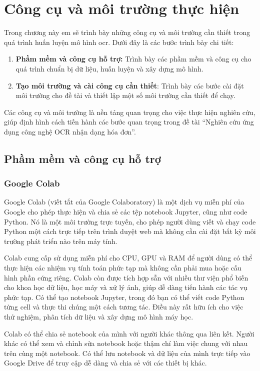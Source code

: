 \chapter{Công cụ và môi trường thực hiện}
Trong chương này em sẽ trình bày những công cụ và môi trường cần thiết trong quá trình huấn luyện mô hình \acrshort*{ocr}. Dưới đây là các bước trình bày chi tiết:
\begin{enumerate}
    \item \textbf{Phầm mềm và công cụ hỗ trợ:} Trình bày các phầm mềm và công cụ cho quá trình chuẩn bị dữ liệu, huấn luyện và xây dựng mô hình.
    \item \textbf{Tạo môi trường và cài công cụ cần thiết}: Trình bày các bước cài đặt môi trường cho đề tài và thiết lập một số môi trường cần thiết để chạy.

\end{enumerate}

Các công cụ và môi trường là nền tảng quan trọng cho việc thực hiện nghiên cứu, giúp định hình cách tiến hành các bước quan trọng trong đề tài ``Nghiên cứu ứng dụng công nghệ OCR nhận dạng hóa đơn''.

\section{Phầm mềm và công cụ hỗ trợ}
\subsection{Google Colab}
Google Colab (viết tắt của Google Colaboratory) là một dịch vụ miễn phí của Google cho phép thực hiện và chia sẻ các tệp notebook Jupyter, cũng như code Python. Nó là một môi trường trực tuyến, cho phép người dùng viết và chạy code Python một cách trực tiếp trên trình duyệt web mà không cần cài đặt bất kỳ môi trường phát triển nào trên máy tính.

Colab cung cấp sử dụng miễn phí cho CPU, GPU và RAM để người dùng có thể thực hiện các nhiệm vụ tính toán phức tạp mà không cần phải mua hoặc cấu hình phần cứng riêng. Colab còn được tích hợp sẵn với nhiều thư viện phổ biến cho khoa học dữ liệu, học máy và xử lý ảnh, giúp dễ dàng tiến hành các tác vụ phức tạp. Có thể tạo notebook Jupyter, trong đó bạn có thể viết code Python từng cell và thực thi chúng một cách tương tác. Điều này rất hữu ích cho việc thử nghiệm, phân tích dữ liệu và xây dựng mô hình máy học.

Colab có thể chia sẻ notebook của mình với người khác thông qua liên kết. Người khác có thể xem và chỉnh sửa notebook hoặc thậm chí làm việc chung với nhau trên cùng một notebook. Có thể lưu notebook và dữ liệu của mình trực tiếp vào Google Drive để truy cập dễ dàng và chia sẻ với các thiết bị khác.

